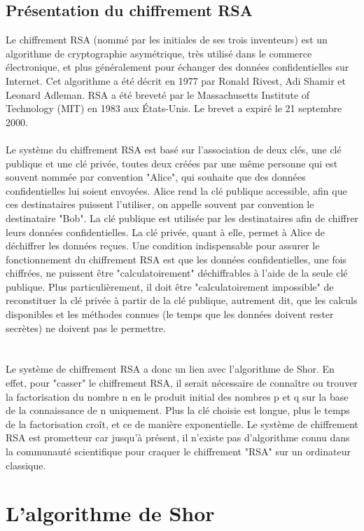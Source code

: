 \documentclass[12pt]{article}
\begin{document}
\subsection{Présentation du chiffrement RSA}
Le chiffrement RSA (nommé par les initiales de ses trois inventeurs) est un algorithme de cryptographie asymétrique, très utilisé dans le commerce électronique, et plus généralement pour échanger des données confidentielles sur Internet. Cet algorithme a été décrit en 1977 par Ronald Rivest, Adi Shamir et Leonard Adleman. RSA a été breveté par le Massachusetts Institute of Technology (MIT) en 1983 aux États-Unis. Le brevet a expiré le 21 septembre 2000.
\\
\\
Le système du chiffrement RSA est basé sur l'association de deux clés, une clé publique et une clé privée, toutes deux créées par une même personne qui est souvent nommée par convention "Alice", qui souhaite que des données confidentielles lui soient envoyées. Alice rend la clé publique accessible, afin que ces destinataires puissent l'utiliser, on appelle souvent par convention le destinataire "Bob". La clé publique est utilisée par les destinataires afin de chiffrer leurs données confidentielles. La clé privée, quant à elle, permet à Alice de déchiffrer les données reçues.
Une condition indispensable pour assurer le fonctionnement du chiffrement RSA est que les données confidentielles, une fois chiffrées, ne puissent être "calculatoirement" déchiffrables à l'aide de la seule clé publique. Plus particulièrement, il doit être "calculatoirement impossible" de reconstituer la clé privée à partir de la clé publique, autrement dit, que les calculs disponibles et les méthodes connues (le temps que les données doivent rester secrètes) ne doivent pas le permettre.
\\
\\
\\
Le système de chiffrement RSA a donc un lien avec l'algorithme de Shor. En effet, pour "casser" le chiffrement RSA, il serait nécessaire de connaître ou trouver la factorisation du nombre n en le produit initial des nombres p et q sur la base de la connaissance de n uniquement. Plus la clé choisie est longue, plus le temps de la factorisation croît, et ce de manière exponentielle. Le système de chiffrement RSA est prometteur car jusqu'à présent, il n'existe pas d'algorithme connu dans la communauté scientifique pour craquer le chiffrement "RSA" sur un ordinateur classique.
\section{L'algorithme de Shor}
\end{document}
